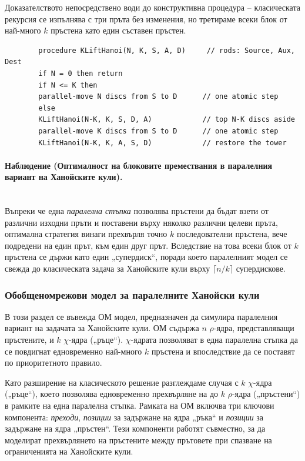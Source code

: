 Доказателството непосредствено води до конструктивна процедура -- класическата рекурсия се изпълнява с три пръта без изменения, но третираме всеки блок от най-много \(k\) пръстена като един съставен пръстен.

\medskip

\begin{minipage}{0.88\linewidth}
	\begin{verbatim}
		procedure KLiftHanoi(N, K, S, A, D)     // rods: Source, Aux, Dest
		if N = 0 then return
		if N <= K then
		parallel-move N discs from S to D      // one atomic step
		else
		KLiftHanoi(N-K, K, S, D, A)            // top N-K discs aside
		parallel-move K discs from S to D      // one atomic step
		KLiftHanoi(N-K, K, A, S, D)            // restore the tower
	\end{verbatim}
\end{minipage}

\paragraph{Наблюдение (Оптималност на блоковите премествания в паралелния вариант на Ханойските кули).}
\mbox{}\\
Въпреки че една \emph{паралелна стъпка} позволява пръстени да бъдат взети от различни изходни пръти и поставени върху няколко различни целеви пръта, оптимална стратегия винаги прехвърля точно $k$ последователни пръстена, вече подредени на един прът, към един друг прът. Вследствие на това всеки блок от $k$ пръстена се държи като един „супердиск“, поради което паралелният модел се свежда до класическата задача за Ханойските кули върху $\lceil n/k \rceil$ супердискове.



\subsubsection{Обобщеномрежови модел за паралелните Ханойски кули}

\hspace*{2.5em}В този раздел се въвежда ОМ модел, предназначен да симулира паралелния вариант на задачата за Ханойските кули. ОМ съдържа \(n\) \(\rho\)-ядра, представляващи пръстените, и \(k\) \(\chi\)-ядра („ръце“). 
\(\chi\)-ядрата позволяват в една паралелна стъпка да се повдигнат едновременно най-много \(k\) пръстена и впоследствие да се поставят по приоритетното правило.

Като разширение на класическото решение разглеждаме случая с \(k\) \(\chi\)-ядра („ръце“), което позволява едновременно прехвърляне на до \(k\) \(\rho\)-ядра („пръстени“) в рамките на една паралелна стъпка. Рамката на ОМ включва три ключови компонента: \emph{преходи}, \emph{позиции} за задържане на ядра „ръка“ и \emph{позиции} за задържане на ядра „пръстен“. Тези компоненти работят съвместно, за да моделират прехвърлянето на пръстените между прътовете при спазване на ограниченията на Ханойските кули.

